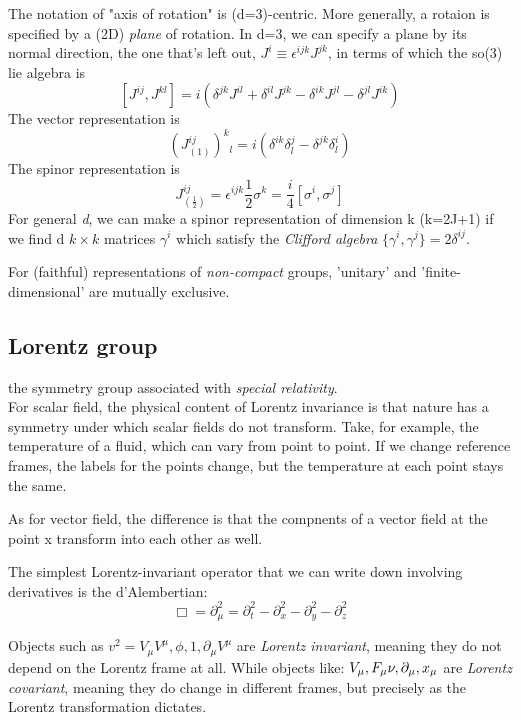  The notation of "axis of rotation" is (d=3)-centric. More generally, 
 a rotaion is specified by a (2D) \emph{plane} of rotation. 
 In d=3, we can specify a plane by its normal
 direction, the one that's left out, $J^i \equiv \epsilon^{ijk}J^{jk}$, in
 terms of which the so(3) lie algebra is 
 \[
     [J^{ij}, J^{kl}] = i(\delta^{jk}J^{il}+\delta^{il}J^{jk}-\delta^{ik}J^{jl}-\delta^{jl}J^{ik})
     \]
 The vector representation is 
 \[
     \left(J^{ij}_{(1)}\right)^k{}_l = i(\delta^{ik}\delta^j_l - \delta^{jk}\delta^i_l)
     \]
 The spinor representation is 
 \[
     J^{ij}_{(\frac{1}{2})} = \epsilon^{ijk}\frac{1}{2}\sigma^k =
     \frac{i}{4}[\sigma^i, \sigma^j]
     \]
 For general \emph{d}, we can make a spinor representation of dimension k
 (k=2J+1) if we find d $k\times k$ matrices $\gamma^i$ which satisfy the
 \emph{Clifford algebra} $\{\gamma^i, \gamma^j\} = 2\delta^{ij}$.

 For (faithful) representations of \emph{non-compact} groups, 'unitary' and
 'finite-dimensional' are mutually exclusive.
\subsection{Lorentz group} 

the symmetry group associated with \emph{special relativity}. \\

For scalar field, the physical content of Lorentz invariance is 
that nature has a symmetry under which scalar fields do not transform. 
Take, for example, the temperature of a fluid, which can vary from 
point to point. If we change reference frames, the labels for the 
points change, but the temperature at each point stays the same.

As for vector field, the difference is that the compnents of a vector field
at the point x transform into each other as well.

The simplest Lorentz-invariant operator that we can write down involving
derivatives is the d'Alembertian:
\[ \Box = \partial_\mu^2 = \partial^2_t - \partial^2_x - \partial^2_y -
\partial^2_z \]

Objects such as $v^2 = V_\mu V^\mu, \phi, 1, \partial_\mu V^\mu$ are
\emph{Lorentz invariant}, meaning they do not depend on the Lorentz frame at
all. While objects like: $V_\mu, F_\mu\nu, \partial_\mu, x_\mu$ are
\emph{Lorentz covariant}, meaning they do change in different frames, but
precisely as the Lorentz transformation dictates.

